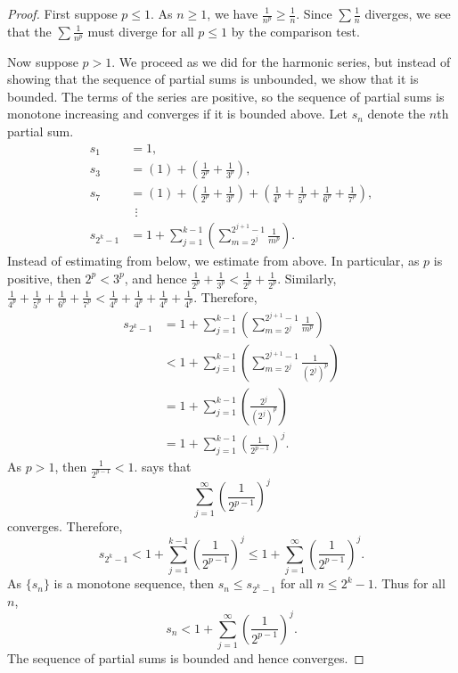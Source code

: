 \begin{proof}
First suppose $p \leq 1$.
As $n \geq 1$, we have
$\frac{1}{n^p} \geq \frac{1}{n}$.  Since
$\sum \frac{1}{n}$ diverges, we see that the 
$\sum \frac{1}{n^p}$ must diverge for all $p \leq 1$ by the comparison test.

Now suppose $p > 1$.
We proceed as we did for the
harmonic series, but instead of showing that the sequence
of partial sums is unbounded, we show that it is bounded.
The terms of the series are positive, so the sequence of partial sums
is monotone increasing and converges if it is bounded
above.
Let $s_n$ denote the $n$th partial sum.
\begin{align*}
 s_1 & = 1 , \\
 s_3 & = \left( 1 \right) + \left( \frac{1}{2^p} + \frac{1}{3^p} \right) , \\
 s_7 & = \left( 1 \right) + \left( \frac{1}{2^p} + \frac{1}{3^p} \right) +
        \left( \frac{1}{4^p} + \frac{1}{5^p} + \frac{1}{6^p} + \frac{1}{7^p} \right) , \\
& ~~ \vdots \\
 s_{2^k - 1} &= 
1 + 
\sum_{j=1}^{k-1}
\left(
\sum_{m=2^j}^{2^{j+1}-1} \frac{1}{m^p}
\right) .
\end{align*}
Instead of estimating from below, we estimate from above.  In particular,
as $p$ is positive, then $2^p < 3^p$, and hence
$\frac{1}{2^p} + \frac{1}{3^p} <
\frac{1}{2^p} + \frac{1}{2^p}$.  Similarly,
$\frac{1}{4^p} + \frac{1}{5^p} +
\frac{1}{6^p} + \frac{1}{7^p} <
\frac{1}{4^p} + \frac{1}{4^p} +
\frac{1}{4^p} + \frac{1}{4^p}$.  Therefore,
\begin{equation*}
\begin{split}
s_{2^k-1}
& =
1+
\sum_{j=1}^{k-1}
\left(
\sum_{m=2^{j}}^{2^{j+1}-1} \frac{1}{m^p}
\right) 
\\
& <
1+
\sum_{j=1}^{k-1}
\left(
\sum_{m=2^{j}}^{2^{j+1}-1} \frac{1}{{(2^j)}^p}
\right) 
\\
& =
1+
\sum_{j=1}^{k-1}
\left(
\frac{2^j}{{(2^j)}^p}
\right) 
\\
& =
1+
\sum_{j=1}^{k-1}
{\left(
\frac{1}{2^{p-1}}
\right)}^j .
\end{split}
\end{equation*}
As $p > 1$, then $\frac{1}{2^{p-1}} < 1$.
 says that
\begin{equation*}
\sum_{j=1}^\infty
{\left(
\frac{1}{2^{p-1}}
\right)}^j
\end{equation*}
converges.  Therefore,
\begin{equation*}
s_{2^k-1} < 
1+
\sum_{j=1}^{k-1}
{\left(
\frac{1}{2^{p-1}}
\right)}^j 
\leq 
1+
\sum_{j=1}^\infty
{\left(
\frac{1}{2^{p-1}}
\right)}^j .
\end{equation*}
As $\{ s_n \}$ is a monotone sequence, then $s_n \leq s_{2^k-1}$
for all $n \leq 2^k-1$.  Thus for all $n$,
\begin{equation*}
s_n < 
1+
\sum_{j=1}^\infty
{\left(
\frac{1}{2^{p-1}}
\right)}^j .
\end{equation*}
The sequence of partial sums is bounded and hence converges.
\end{proof}

